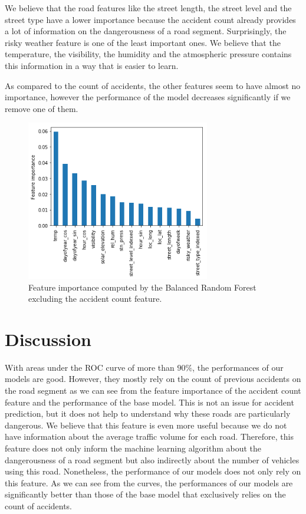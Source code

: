 \documentclass[conference]{IEEEtran}
\begin{document}
We believe that the road features like the street length, the street level and the street type have a lower importance because the accident count already provides a lot of information on the dangerousness of a road segment. Surprisingly, the risky weather feature is one of the least important ones. We believe that the temperature, the visibility, the humidity and the atmospheric pressure contains this information in a way that is easier to learn. 

As compared to the count of accidents, the other features seem to have almost no
importance, however the performance of the model decreases significantly if we
remove one of them. 

\begin{figure}[htbp]
\centerline{\includegraphics[height=7cm, keepaspectratio]{Figures/brf_fi_nocount.png}}
\caption{Feature importance computed by the Balanced Random Forest excluding the accident count feature.}
\label{feature importances}
\end{figure}


\section{Discussion}
\label{sec:discussion}

With areas under the ROC curve of more than $90\%$, the performances of our models are good.
However, they mostly rely on the count of previous accidents on the road segment as we can see from the feature importance of the accident count feature and the performance of the base model.
This is not an issue for accident prediction, but it does not help to 
understand why these roads are particularly dangerous. We believe that
this feature is even more useful because we do not have information
about the average traffic volume for each road. Therefore, this feature does
not only inform the machine learning algorithm about the dangerousness of a road
segment but also indirectly about the number of vehicles using this road.
Nonetheless, the performance of our models does not only rely on this feature.
As we can see from the curves, the performances of our models are significantly
better than those of the base model that exclusively relies on the count of accidents.
\end{document}
